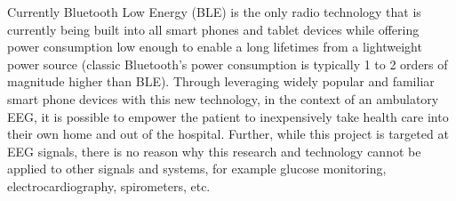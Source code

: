 \documentclass[]{article}
\begin{document}
Currently Bluetooth Low Energy (BLE) is the only radio technology that is currently being built into all smart phones and tablet devices while offering power consumption low enough to enable a long lifetimes from a lightweight power source (classic Bluetooth’s power consumption is typically 1 to 2 orders of magnitude higher than BLE). Through leveraging widely popular and familiar smart phone devices with this new technology, in the context of an ambulatory EEG, it is possible to empower the patient to inexpensively take health care into their own home and out of the hospital. 
Further, while this project is targeted at EEG signals, there is no reason why this research and technology cannot be applied to other signals and systems, for example glucose monitoring, electrocardiography, spirometers, etc.
\end{document}
